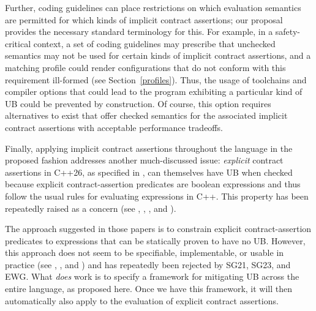 Further, coding guidelines can place restrictions on which evaluation semantics are permitted for which kinds of implicit contract assertions; our proposal provides the necessary standard terminology for this. For example, in a safety-critical context, a set of coding guidelines may prescribe that unchecked semantics may not be used for certain kinds of implicit contract assertions, and a matching profile could render configurations that do not conform with this requirement ill-formed (see Section~\ref{profiles}). Thus, the usage of toolchains and compiler options that could lead to the program exhibiting a particular kind of UB could be prevented by construction. Of course, this option requires alternatives to exist that offer checked semantics for the associated implicit contract assertions with acceptable performance tradeoffs.

Finally, applying implicit contract assertions throughout the language in the proposed fashion addresses another much-discussed issue: \emph{explicit} contract assertions in C++26, as specified in \cite{P2900R14}, can themselves have UB when checked because explicit contract-assertion predicates are boolean expressions and thus follow the usual rules for evaluating expressions in C++. This property has been repeatedly raised as a concern (see \cite{P2680R1}, \cite{P3173R0}, \cite{P3285R0}, and \cite{P3362R0}).

The approach suggested in those papers is to constrain explicit contract-assertion predicates to expressions that can be statically proven to have no UB. However, this approach does not seem to be specifiable, implementable, or usable in practice (see  \cite{P3376R0}, \cite{P3386R0}, and \cite{P3499R1}) and has repeatedly been rejected by SG21, SG23, and EWG. What \emph{does} work is to specify a framework for mitigating UB across the entire language, as proposed here. Once we have this framework, it will then automatically also apply to the evaluation of explicit contract assertions.

